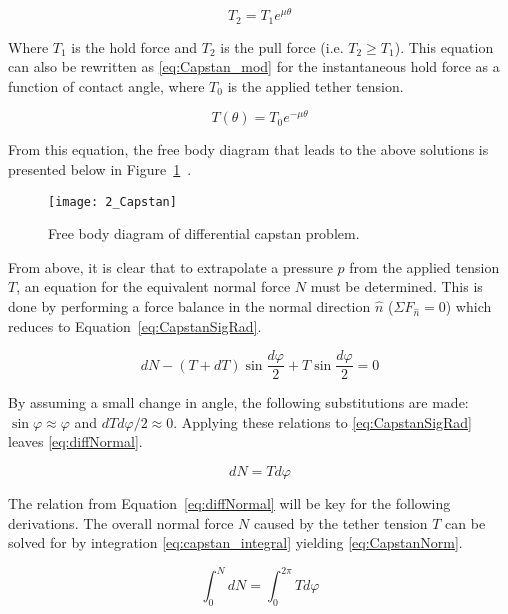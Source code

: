 \begin{equation}
	\label{eq:Capstan}
	T_2 = T_1 e^{\mu\theta}
\end{equation}

Where $T_1$ is the hold force and $T_2$ is the pull force (i.e. $T_2 \geq T_1$). This equation can also be rewritten as \ref{eq:Capstan_mod} for the instantaneous hold force as a function of contact angle, where $T_0$ is the applied tether tension. 

\begin{equation}
	\label{eq:Capstan_mod}
	T(\theta) = T_0 e^{-\mu\theta}
\end{equation}

From this equation, the free body diagram that leads to the above solutions is presented below in Figure~\ref{fig:Capstan}~\cite{capstanman}. 

\begin{figure}[H]
	\centering
	\texttt{[image: 2\_Capstan]}
	\caption[Free body diagram of differential capstan problem.]{Free body diagram of differential capstan problem. \protect\cite{capstanman}}
	\label{fig:Capstan}
\end{figure}

From above, it is clear that to extrapolate a pressure $p$ from the applied tension $T$, an equation for the equivalent normal force $N$ must be determined. This is done by performing a force balance in the normal direction $\hat{n}$ ($\Sigma F_{\hat{n}} = 0 $) which reduces to Equation~\ref{eq:CapstanSigRad}.

\begin{equation}
	\label{eq:CapstanSigRad}
	dN-(T+dT)\sin \frac{d\varphi}{2}+T\sin \frac{d\varphi}{2}= 0
\end{equation}

By assuming a small change in angle, the following substitutions are made: $\sin \varphi \approx \varphi$ and $dT d\varphi/2 \approx 0$. Applying these relations to \ref{eq:CapstanSigRad} leaves \ref{eq:diffNormal}.

\begin{equation}
	\label{eq:diffNormal}
	dN = T d\varphi
\end{equation}

The relation from Equation~\ref{eq:diffNormal} will be key for the following derivations. The overall normal force $N$ caused by the tether tension $T$ can be solved for by integration \ref{eq:capstan_integral} yielding \ref{eq:CapstanNorm}.

\begin{equation}
	\label{eq:capstan_integral}
	\int_0^N dN =\int_0^{2\pi} T d\varphi
\end{equation}

